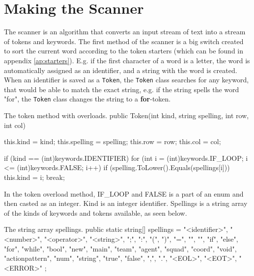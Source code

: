\section{Making the Scanner}
The scanner is an algorithm that converts an input stream of text into a stream of tokens and keywords. The first method of the scanner is a big switch created to sort the current word according to the token starters (which can be found in appendix \ref{ap:starters}). E.g. if the first character of a word is a letter, the word is automatically assigned as an identifier, and a string with the word is created.\\
When an identifier is saved as a \texttt{Token}, the \texttt{Token} class searches for any keyword, that would be able to match the exact string, e.g. if the string spells the word "for", the \texttt{Token} class changes the string to a \textbf{for}-token.\\

\begin{source}{The token method with overloads.}{}
public Token(int kind, string spelling, int row, int col)
        {
            this.kind = kind;
            this.spelling = spelling;
            this.row = row;
            this.col = col;

            if (kind == (int)keywords.IDENTIFIER)
            {
                for (int i = (int)keywords.IF_LOOP; i <= (int)keywords.FALSE; i++)
                {
                    if (spelling.ToLower().Equals(spellings[i]))
                    {
                        this.kind = i;
                        break;
                    }
                }
            }
        }
\end{source}
In the token overload method, IF\_LOOP and FALSE is a part of an enum and then casted as an integer. Kind is an integer identifier. Spellings is a string array of the kinds of keywords and tokens available, as seen below.

\begin{source}{The string array spellings.}{}
public static string[] spellings = 
        {
            "<identifier>", "<number>", "<operator>", "<string>", ";", ":", "(", ")", "=", "{", "}", 
            "if", "else", "for", "while", "bool", "new", "main", "team", "agent", "squad", "coord", "void", 
            "actionpattern", "num", "string", "true", "false", ",", ".", "<EOL>", "<EOT>", "<ERROR>"                         
        };
\end{source}

